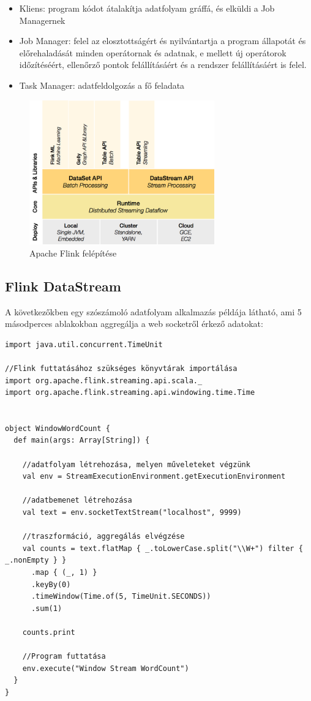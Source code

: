 \documentclass[a4paper,12pt]{article}
\begin{document}
\begin{itemize}
\item Kliens: program kódot átalakítja adatfolyam gráffá, és elküldi a Job Managernek
\item Job Manager: felel az elosztottságért és nyilvántartja a program állapotát és előrehaladását minden operátornak és adatnak, e mellett új operátorok időzítéséért, ellenőrző pontok felállításáért és a rendszer felállításáért is felel.
\item Task Manager: adatfeldolgozás a fő feladata
\end{itemize}

\begin{figure}[H]
\centering
\includegraphics[width=80mm]{img/flink.png}
\caption{Apache Flink felépítése \cite{flink} \label{apache_flink}}
\end{figure}

\subsection{Flink DataStream}

A következőkben egy szószámoló adatfolyam alkalmazás példája látható, ami 5 másodperces ablakokban aggregálja a web socketről érkező adatokat:


\begin{lstlisting}[style=Scala]
import java.util.concurrent.TimeUnit

//Flink futtatásához szükséges könyvtárak importálása
import org.apache.flink.streaming.api.scala._
import org.apache.flink.streaming.api.windowing.time.Time


object WindowWordCount {
  def main(args: Array[String]) {

    //adatfolyam létrehozása, melyen műveleteket végzünk
    val env = StreamExecutionEnvironment.getExecutionEnvironment
    
    //adatbemenet létrehozása
    val text = env.socketTextStream("localhost", 9999)

	//traszformáció, aggregálás elvégzése
    val counts = text.flatMap { _.toLowerCase.split("\\W+") filter { _.nonEmpty } }
      .map { (_, 1) }
      .keyBy(0)
      .timeWindow(Time.of(5, TimeUnit.SECONDS))
      .sum(1)

    counts.print

	//Program futtatása
    env.execute("Window Stream WordCount")
  }
}
\end{lstlisting}
\end{document}

